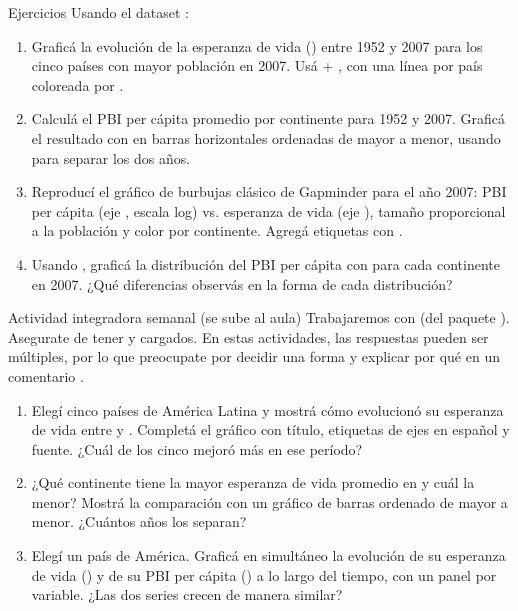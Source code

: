 \documentclass[8pt]{beamer}
\begin{document}
	\begin{frame}[fragile]{Ejercicios}
		Usando el dataset :

		\begin{enumerate}
			\item Graficá la evolución de la esperanza de vida () entre 1952 y 2007 para los cinco países con mayor población en 2007. Usá  + , con una línea por país coloreada por .

			\item Calculá el PBI per cápita promedio por continente para 1952 y 2007. Graficá el resultado con  en barras horizontales ordenadas de mayor a menor, usando  para separar los dos años.

			\item Reproducí el gráfico de burbujas clásico de Gapminder para el año 2007: PBI per cápita (eje , escala log) vs. esperanza de vida (eje ), tamaño proporcional a la población y color por continente. Agregá etiquetas con .

			\item Usando , graficá la distribución del PBI per cápita con  para cada continente en 2007. ¿Qué diferencias observás en la forma de cada distribución?
		\end{enumerate}
	\end{frame}



	\begin{frame}[fragile]{Actividad integradora semanal (se sube al aula)}
		Trabajaremos con  (del paquete ). Asegurate de tener  y  cargados. En estas actividades, las respuestas pueden ser m\'ultiples, por lo que preocupate por decidir una forma y explicar por qu\'e en un comentario .

		\begin{enumerate}
			\item Elegí cinco países de América Latina y mostrá cómo evolucionó su esperanza de vida entre  y . Completá el gráfico con título, etiquetas de ejes en español y fuente. ¿Cuál de los cinco mejoró más en ese período?

			\item ¿Qué continente tiene la mayor esperanza de vida promedio en  y cuál la menor? Mostrá la comparación con un gráfico de barras ordenado de mayor a menor. ¿Cuántos años los separan?

			\item Elegí un país de América. Graficá en simultáneo la evolución de su esperanza de vida () y de su PBI per cápita () a lo largo del tiempo, con un panel por variable. ¿Las dos series crecen de manera similar?
		\end{enumerate}
	\end{frame}
\end{document}
